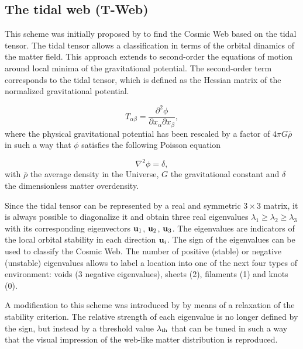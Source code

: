 \documentclass[a4,useAMS,usenatbib,usegraphicx]{mn2e}
\newcommand{\eq}[2]{\begin{equation} \label{eq:#1} #2 \end{equation}}
\begin{document}
\subsection{The tidal web (T-Web)}
\label{subsec:Tweb}

This scheme was initially proposed by \citet{Hahn07}  to find the
Cosmic Web based on the tidal tensor. 
The tidal tensor allows a classification in terms of the orbital
dinamics of the matter field.
This approach extends to second-order the equations of motion around 
local minima of the gravitational potential. 
The second-order term corresponds to the tidal tensor, which is
defined as the Hessian matrix of the normalized gravitational
potential.


\eq{V_web}
{	T_{\alpha\beta} = \frac{\partial^2\phi}{\partial x_{\alpha}\partial x_{\beta}},	}
where the physical gravitational potential has been rescaled by a
factor of   $4\pi G\bar{\rho}$ in such a way that $\phi$ satisfies the following 
Poisson equation

\eq{Poisson}
{	\nabla^2\phi = \delta,	}
with $\bar{\rho}$ the average density in the Universe, $G$ the 
gravitational constant and $\delta$ the dimensionless matter
overdensity. 

Since the tidal tensor can be represented by a real and  symmetric
$3\times 3$ matrix, it is always possible to diagonalize  
it and obtain three real eigenvalues $\lambda_{1}\geq\lambda_{2}\geq
\lambda_3$ with its corresponding eigenvectors ${\bf u}_{1}$, ${\bf u}_{2}$,
${\bf u}_{3}$. 
The eigenvalues are indicators of the local  orbital stability
in each direction ${\bf u}_i$. 
The sign of the eigenvalues can be used to classify the Cosmic Web.
The number of positive (stable) or negative (unstable) eigenvalues allows 
to label a location into one of the next four types of environment: 
voids (3 negative eigenvalues), sheets (2), filaments (1) and knots (0). 

A modification to this scheme was introduced by \citet{Forero09}
by means of a relaxation of the stability criterion. 
The relative strength  of each eigenvalue is no longer defined by the
sign, but instead by a threshold value $\lambda_{\rm th}$ that can be
tuned in such a way that the visual impression of the web-like matter
distribution is reproduced. 
 
\end{document}
